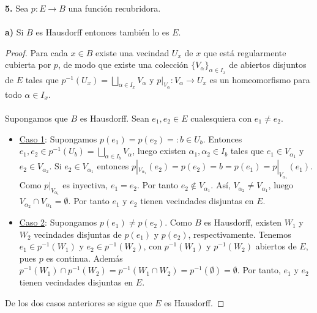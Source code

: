 \textbf{5.} Sea $p:E\to B$ una función recubridora.\\\\
\textbf{a)} Si $B$ es Hausdorff entonces también lo es $E$.
\begin{proof}
Para cada $x\in B$ existe una vecindad $U_x$ de $x$ que está regularmente cubierta por $p$, de modo que existe una colección $\{V_\alpha\}_{\alpha\in I_x}$ de abiertos disjuntos de $E$ tales que $p^{-1}(U_x)=\bigsqcup_{\alpha\in I_x}V_\alpha$ y $p|_{V_\alpha}:V_\alpha\to U_x$ es un homeomorfismo para todo $\alpha\in I_x$.\\\\ 
Supongamos que $B$ es Hausdorff. Sean $e_1,e_2\in E$ cualesquiera con $e_1\neq e_2$.
\begin{itemize}
   \item \underline{Caso 1}: Supongamos $p(e_1)=p(e_2)=:b\in U_b$. Entonces $e_1,e_2\in p^{-1}(U_b)=\bigsqcup_{\alpha\in I_b}V_\alpha$, luego existen $\alpha_1,\alpha_2\in I_b$ tales que $e_1\in V_{\alpha_1}$ y $e_2\in V_{\alpha_2}$. Si $e_2\in V_{\alpha_1}$ entonces $p|_{V_{\alpha_1}}(e_2)=p(e_2)=b=p(e_1)=p|_{V_{\alpha_1}}(e_1)$. Como $p|_{V_{\alpha_1}}$ es inyectiva, $e_1=e_2$. Por tanto $e_2\notin V_{\alpha_1}$. Así, $V_{\alpha_2}\neq V_{\alpha_1}$, luego $V_{\alpha_2}\cap V_{\alpha_1}=\emptyset$. Por tanto $e_1$ y $e_2$ tienen vecindades disjuntas en $E$.
   \item \underline{Caso 2}: Supongamos $p(e_1)\neq p(e_2)$. Como $B$ es Hausdorff, existen $W_1$ y $W_2$ vecindades disjuntas de $p(e_1)$ y $p(e_2)$, respectivamente. Tenemos $e_1\in p^{-1}(W_1)$ y $e_2\in p^{-1}(W_2)$, con $p^{-1}(W_1)$ y $p^{-1}(W_2)$ abiertos de $E$, pues $p$ es continua. Además $p^{-1}(W_1)\cap p^{-1}(W_2)=p^{-1}(W_1\cap W_2)=p^{-1}(\emptyset)=\emptyset$. Por tanto, $e_1$ y $e_2$ tienen vecindades disjuntas en $E$.
\end{itemize}
De los dos casos anteriores se sigue que $E$ es Hausdorff.
\end{proof}
